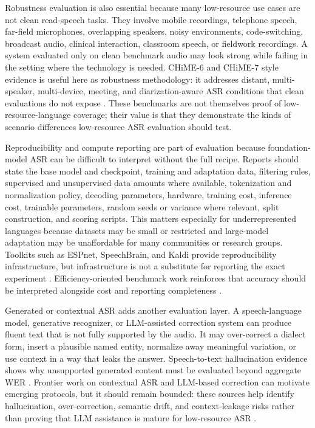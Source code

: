 \documentclass[pdflatex,sn-basic]{sn-jnl}
\theoremstyle{thmstyleone}
\theoremstyle{thmstyletwo}
\theoremstyle{thmstylethree}
\begin{document}
Robustness evaluation is also essential because many low-resource use cases are not clean read-speech tasks. They involve mobile recordings, telephone speech, far-field microphones, overlapping speakers, noisy environments, code-switching, broadcast audio, clinical interaction, classroom speech, or fieldwork recordings. A system evaluated only on clean benchmark audio may look strong while failing in the setting where the technology is needed. CHiME-6 and CHiME-7 style evidence is useful here as robustness methodology: it addresses distant, multi-speaker, multi-device, meeting, and diarization-aware ASR conditions that clean evaluations do not expose \citep{watanabe2020chime6,cornell2023chime7}. These benchmarks are not themselves proof of low-resource-language coverage; their value is that they demonstrate the kinds of scenario differences low-resource ASR evaluation should test.

Reproducibility and compute reporting are part of evaluation because foundation-model ASR can be difficult to interpret without the full recipe. Reports should state the base model and checkpoint, training and adaptation data, filtering rules, supervised and unsupervised data amounts where available, tokenization and normalization policy, decoding parameters, hardware, training cost, inference cost, trainable parameters, random seeds or variance where relevant, split construction, and scoring scripts. This matters especially for underrepresented languages because datasets may be small or restricted and large-model adaptation may be unaffordable for many communities or research groups. Toolkits such as ESPnet, SpeechBrain, and Kaldi provide reproducibility infrastructure, but infrastructure is not a substitute for reporting the exact experiment \citep{watanabe2018espnet,ravanelli2021speechbrain,povey2011kaldi}. Efficiency-oriented benchmark work reinforces that accuracy should be interpreted alongside cost and reporting completeness \citep{feng2022superbslt}.

Generated or contextual ASR adds another evaluation layer. A speech-language model, generative recognizer, or LLM-assisted correction system can produce fluent text that is not fully supported by the audio. It may over-correct a dialect form, insert a plausible named entity, normalize away meaningful variation, or use context in a way that leaks the answer. Speech-to-text hallucination evidence shows why unsupported generated content must be evaluated beyond aggregate WER \citep{koenecke2024carelesswhisper}. Frontier work on contextual ASR and LLM-based correction can motivate emerging protocols, but it should remain bounded: these sources help identify hallucination, over-correction, semantic drift, and context-leakage risks rather than proving that LLM assistance is mature for low-resource ASR \citep{ma2024asrerrorcorrection,koudounas2025shallow,wang2025contextasrbench}.
\end{document}
